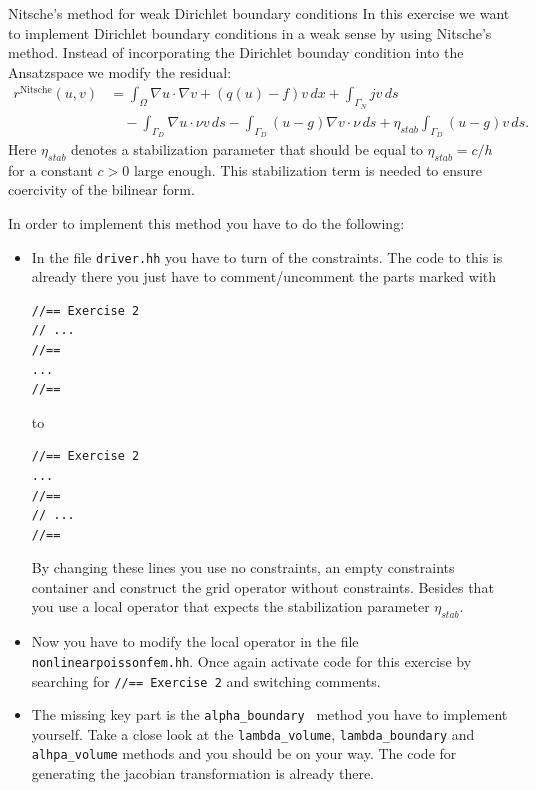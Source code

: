 \documentclass[12pt,a4paper]{article}
\begin{document}
\begin{Exercise}{Nitsche's method for weak Dirichlet boundary
    conditions}
  In this exercise we want to implement Dirichlet boundary conditions
  in a weak sense by using Nitsche's method.  Instead of
  incorporating the Dirichlet bounday condition into the Ansatzspace
  we modify the residual:
  \begin{align*}
    r^{\text{Nitsche}}(u,v) &= \int_\Omega \nabla u \cdot \nabla v + (q(u)-f)v\,dx + \int_{\Gamma_N} jv\,ds \\
    &\quad - \int_{\Gamma_D} \nabla u \cdot\nu v\,ds - \int_{\Gamma_D} (u-g)\nabla v \cdot\nu\,ds
    + \eta_{stab} \int_{\Gamma_D} (u-g)v\,ds.
  \end{align*}
  Here $\eta_{stab}$ denotes a stabilization parameter that should be
  equal to $\eta_{stab}=c/h$ for a constant $c>0$ large enough.  This
  stabilization term is needed to ensure coercivity of the bilinear
  form.

  In order to implement this method you have to do the following:
  \begin{itemize}
  \item In the file \lstinline{driver.hh} you have to turn of the
    constraints.  The code to this is already there you just have to
    comment/uncomment the parts marked with
    \begin{lstlisting}
//== Exercise 2
// ...
//==
...
//==
    \end{lstlisting}
    to
    \begin{lstlisting}
//== Exercise 2
...
//==
// ...
//==
    \end{lstlisting}
    By changing these lines you use no constraints, an empty
    constraints container and construct the grid operator without
    constraints.  Besides that you use a local operator that expects
    the stabilization parameter $\eta_{stab}$.
  \item Now you have to modify the local operator in the file
    \lstinline{nonlinearpoissonfem.hh}.  Once again activate code for
    this exercise by searching for \lstinline{//== Exercise 2} and
    switching comments.
  \item The missing key part is the \lstinline{alpha_boundary } method
    you have to implement yourself.  Take a close look at the
    \lstinline{lambda_volume}, \lstinline{lambda_boundary} and
    \lstinline{alhpa_volume} methods and you should be on your way.
    The code for generating the jacobian transformation is already
    there.
  \end{itemize}


\end{Exercise}
\end{document}
